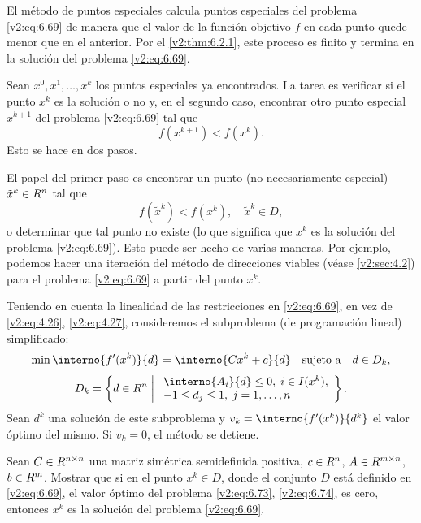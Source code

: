 El método de puntos especiales calcula puntos especiales del problema \eqref{v2:eq:6.69} de manera que el valor de la función objetivo $f$ en cada punto quede menor que en el anterior. Por el \cref{v2:thm:6.2.1}, este proceso es finito y termina en la solución del problema \eqref{v2:eq:6.69}.

Sean $x^0, x^1, \dots, x^k$ los puntos especiales ya encontrados. La tarea es verificar si el punto $x^k$ es la solución o no y, en el segundo caso, encontrar otro punto especial $x^{k+1}$ del problema \eqref{v2:eq:6.69} tal que
\begin{equation}
    f(x^{k+1}) < f(x^k).
    \label{v2:eq:6.71}
\end{equation}
Esto se hace en dos pasos.

El papel del primer paso es encontrar un punto (no necesariamente especial) $\tilde{x}^k \in R^n$ tal que
\begin{equation}
    f(\tilde{x}^k) < f(x^k), \quad \tilde{x}^k \in D,
    \label{v2:eq:6.72}
\end{equation}
o determinar que tal punto no existe (lo que significa que $x^k$ es la solución del problema \eqref{v2:eq:6.69}). Esto puede ser hecho de varias maneras. Por ejemplo, podemos hacer una iteración del método de direcciones viables (véase \cref{v2:sec:4.2}) para el problema \eqref{v2:eq:6.69} a partir del punto $x^k$.

Teniendo en cuenta la linealidad de las restricciones en \eqref{v2:eq:6.69}, en vez de \eqref{v2:eq:4.26}, \eqref{v2:eq:4.27}, consideremos el subproblema (de programación lineal) simplificado:
\begin{equation}
    \min \interno{f'(x^k)}{d} = \interno{C x^k + c}{d} \quad \text{sujeto a} \quad d \in D_k,
    \label{v2:eq:6.73}
\end{equation}
\begin{equation}
    D_k = \left\{ d \in \Rn \;\middle|\; \begin{array}{l} \interno{A_i}{d} \le 0, \; i \in I(x^k), \\ -1 \le d_j \le 1, \; j = 1, \dots, n \end{array} \right\}.
    \label{v2:eq:6.74}
\end{equation}
Sean $d^k$ una solución de este subproblema y $v_k = \interno{f'(x^k)}{d^k}$ el valor óptimo del mismo. Si $v_k = 0$, el método se detiene.

\begin{exercise}\label{v2:ejer:6.2.2}
    Sean $C \in R^{n \times n}$ una matriz simétrica semidefinida positiva, $c \in R^n$, $A \in R^{m \times n}$, $b \in R^m$. 
    Mostrar que si en el punto $x^k \in D$, donde el conjunto $D$ está definido en \eqref{v2:eq:6.69}, el valor óptimo del problema \eqref{v2:eq:6.73}, \eqref{v2:eq:6.74}, es cero, entonces $x^k$ es la solución del problema \eqref{v2:eq:6.69}.
\end{exercise}

